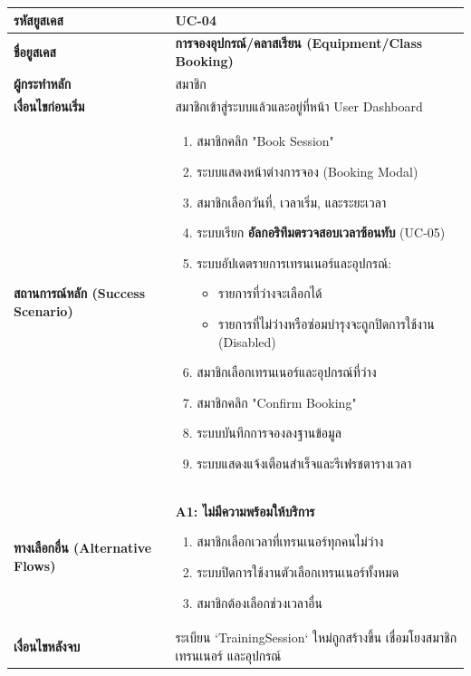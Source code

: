 \begin{longtable}{|p{3cm}|p{12cm}|}
\hline
\textbf{รหัสยูสเคส} & UC-04 \\ \hline
\textbf{ชื่อยูสเคส} & \textbf{การจองอุปกรณ์/คลาสเรียน (Equipment/Class Booking)} \\ \hline
\textbf{ผู้กระทำหลัก} & สมาชิก \\ \hline
\textbf{เงื่อนไขก่อนเริ่ม} & สมาชิกเข้าสู่ระบบแล้วและอยู่ที่หน้า User Dashboard \\ \hline
\textbf{สถานการณ์หลัก (Success Scenario)} & 
\begin{enumerate}
    \item สมาชิกคลิก "Book Session"
    \item ระบบแสดงหน้าต่างการจอง (Booking Modal)
    \item สมาชิกเลือกวันที่, เวลาเริ่ม, และระยะเวลา
    \item ระบบเรียก \textbf{อัลกอริทึมตรวจสอบเวลาซ้อนทับ} (UC-05)
    \item ระบบอัปเดตรายการเทรนเนอร์และอุปกรณ์:
    \begin{itemize}
        \item รายการที่ว่างจะเลือกได้
        \item รายการที่ไม่ว่างหรือซ่อมบำรุงจะถูกปิดการใช้งาน (Disabled)
    \end{itemize}
    \item สมาชิกเลือกเทรนเนอร์และอุปกรณ์ที่ว่าง
    \item สมาชิกคลิก "Confirm Booking"
    \item ระบบบันทึกการจองลงฐานข้อมูล
    \item ระบบแสดงแจ้งเตือนสำเร็จและรีเฟรชตารางเวลา
\end{enumerate} \\ \hline
\textbf{ทางเลือกอื่น (Alternative Flows)} & 
\textbf{A1: ไม่มีความพร้อมให้บริการ}
\begin{enumerate}
    \item สมาชิกเลือกเวลาที่เทรนเนอร์ทุกคนไม่ว่าง
    \item ระบบปิดการใช้งานตัวเลือกเทรนเนอร์ทั้งหมด
    \item สมาชิกต้องเลือกช่วงเวลาอื่น
\end{enumerate} \\ \hline
\textbf{เงื่อนไขหลังจบ} & ระเบียน `TrainingSession` ใหม่ถูกสร้างขึ้น เชื่อมโยงสมาชิก เทรนเนอร์ และอุปกรณ์ \\ \hline
\end{longtable}

